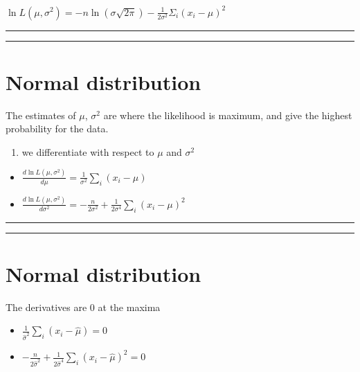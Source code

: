 \documentclass[
]{book}
\providecommand{\tightlist}{%
  \setlength{\itemsep}{0pt}\setlength{\parskip}{0pt}}
\begin{document}
\(\ln L(\mu, \sigma^2)=-n \ln(\sigma \sqrt{2 \pi})-\frac{1}{2\sigma^2} \Sigma_i(x_i-\mu)^2\)

\begin{center}\rule{0.5\linewidth}{0.5pt}\end{center}

\begin{center}\rule{0.5\linewidth}{0.5pt}\end{center}

\hypertarget{normal-distribution-11}{%
\section{Normal distribution}\label{normal-distribution-11}}

The estimates of \(\mu\), \(\sigma^2\) are where the likelihood is maximum, and give the highest probability for the data.

\begin{enumerate}
\def\labelenumi{\arabic{enumi}.}
\setcounter{enumi}{2}
\tightlist
\item
  we differentiate with respect to \(\mu\) and \(\sigma^2\)
\end{enumerate}

\begin{itemize}
\item
  \(\frac{d \ln L(\mu, \sigma^2)}{d\mu}=\frac{1}{\sigma^2} \sum_i(x_i-\mu)\)
\item
  \(\frac{d \ln L(\mu, \sigma^2)}{d\sigma^2}=-\frac{n}{2 \sigma^2}+\frac{1}{2\sigma^4} \sum_i(x_i-\mu)^2\)
\end{itemize}

\begin{center}\rule{0.5\linewidth}{0.5pt}\end{center}

\begin{center}\rule{0.5\linewidth}{0.5pt}\end{center}

\hypertarget{normal-distribution-12}{%
\section{Normal distribution}\label{normal-distribution-12}}

The derivatives are \(0\) at the maxima

\begin{itemize}
\tightlist
\item
  \(\frac{1}{\hat{\sigma}^2} \sum_i(x_i-\hat{\mu})=0\)
\item
  \(-\frac{n}{2 \hat{\sigma}^2}+\frac{1}{2\hat{\sigma}^4} \sum_i(x_i-\hat{\mu})^2=0\)
\end{itemize}
\end{document}
